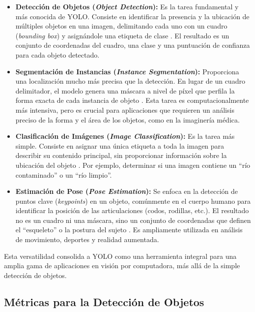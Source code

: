\begin{itemize}
    \item \textbf{Detección de Objetos (\textit{Object Detection}):} Es la tarea fundamental y más conocida de YOLO. Consiste en identificar la presencia y la ubicación de múltiples objetos en una imagen, delimitando cada uno con un cuadro (\textit{bounding box}) y asignándole una etiqueta de clase \cite{terven2023yolo}. El resultado es un conjunto de coordenadas del cuadro, una clase y una puntuación de confianza para cada objeto detectado.

    \item \textbf{Segmentación de Instancias (\textit{Instance Segmentation}):} Proporciona una localización mucho más precisa que la detección. En lugar de un cuadro delimitador, el modelo genera una máscara a nivel de píxel que perfila la forma exacta de cada instancia de objeto \cite{ultralyticsYOLOv8}. Esta tarea es computacionalmente más intensiva, pero es crucial para aplicaciones que requieren un análisis preciso de la forma y el área de los objetos, como en la imaginería médica.

    \item \textbf{Clasificación de Imágenes (\textit{Image Classification}):} Es la tarea más simple. Consiste en asignar una única etiqueta a toda la imagen para describir su contenido principal, sin proporcionar información sobre la ubicación del objeto \cite{sapkota2025yolo}. Por ejemplo, determinar si una imagen contiene un ``río contaminado'' o un ``río limpio''.

    \item \textbf{Estimación de Pose (\textit{Pose Estimation}):} Se enfoca en la detección de puntos clave (\textit{keypoints}) en un objeto, comúnmente en el cuerpo humano para identificar la posición de las articulaciones (codos, rodillas, etc.). El resultado no es un cuadro ni una máscara, sino un conjunto de coordenadas que definen el ``esqueleto'' o la postura del sujeto \cite{ultralyticsYOLOv8}. Es ampliamente utilizada en análisis de movimiento, deportes y realidad aumentada.
\end{itemize}

Esta versatilidad consolida a YOLO como una herramienta integral para una amplia gama de aplicaciones en visión por computadora, más allá de la simple detección de objetos.

\subsection{Métricas para la Detección de Objetos}
\label{subsec:metrics}

